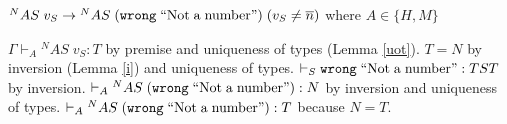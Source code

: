 \begin{case}
$^{N}AS\;v_{S}\rightarrow{^{N}A}S\;(\mathtt{wrong}\;\mathrm{``Not\;a\;number"})\;(v_{S}\neq\overline{n})$ where $A\in\lbrace H,M\rbrace$

$\Gamma\vdash_{A}{^{N}AS}\;v_{S}:T$ by premise and uniqueness of types (Lemma \ref{uot}).  $T=N$ by inversion (Lemma \ref{i}) and uniqueness of types.  $\vdash_{S}\mathtt{wrong}\;\mathrm{``Not\;a\;number"}:TST$ by inversion.  $\vdash_{A}{^{N}A}S\;(\mathtt{wrong}\;\mathrm{``Not\;a\;number"}):N$ by inversion and uniqueness of types.  $\vdash_{A}{^{N}A}S\;(\mathtt{wrong}\;\mathrm{``Not\;a\;number"}):T$ because $N=T$.
\end{case}